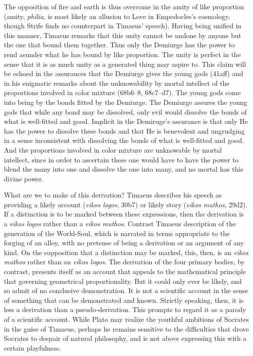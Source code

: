 The opposition of fire and earth is thus overcome in the amity of like proportion (amity, \emph{philia}, is most likely an allusion to Love in Empedocles's cosmology, though Strife finds no counterpart in Timaeus' speech). Having being unified in this manner, Timaeus remarks that this unity cannot be undone by anyone but the one that bound them together. Thus only the Demiurge has the power to rend asunder what he has bound by like proportion. The unity is perfect in the sense that it is as much unity as a generated thing may aspire to. This claim will be echoed in the assurances that the Demiurge gives the young gods (41aff) and in his enigmatic remarks about the unknowability by mortal intellect of the proportions involved in color mixture (68b6–8, 68c7–d7). The young gods come into being by the bonds fitted by the Demiurge. The Demiurge assures the young gods that while any bond may be dissolved, only evil would dissolve the bonds of what is well-fitted and good. Implicit in the Demiruge's assurance is that only He has the power to dissolve these bonds and that He is benevolent and ungrudging in a sense inconsistent with dissolving the bonds of what is well-fitted and good. And the proportions involved in color mixture are unknowable by mortal intellect, since in order to ascertain these one would have to have the power to blend the many into one and dissolve the one into many, and no mortal has this divine power.

What are we to make of this derivation? Timaeus describes his speech as providing a likely account (\emph{eikos logos}, 30b7) or likely story (\emph{eikos muthos}, 29d2). If a distinction is to be marked between these expressions, then the derivation is a \emph{eikos logos} rather than a \emph{eikos muthos}. Contrast Timaeus description of the generation of the World-Soul, which is narrated in terms appropriate to the forging of an alloy, with no pretense of being a derivation or an argument of any kind. On the supposition that a distinction may be marked, this, then, is an \emph{eikos muthos} rather than an \emph{eikos logos}. The derivation of the four primary bodies, by contrast, presents itself as an account that appeals to the mathematical principle that governing geometrical proportionality. But it could only ever be likely, and so admit of no conclusive demonstration. It is not a scientific account in the sense of something that can be demonstrated and known. Strictly speaking, then, it is less a derivation than a pseudo-derivation. This prompts \citet{Prtichard:1990aa} to regard it as a parody of a scientific account. While Plato may realize the youthful ambitions of Socrates in the guise of Timaeus, perhaps he remains sensitive to the difficulties that drove Socrates to despair of natural philosophy, and is not above expressing this with a certain playfulness.

